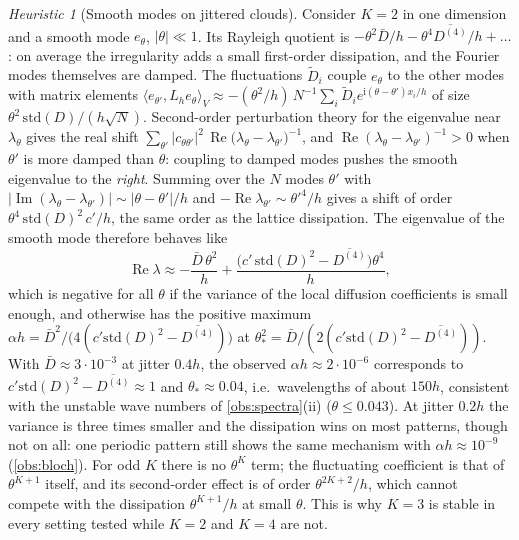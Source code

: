\documentclass[11pt,a4paper]{article}
\theoremstyle{plain}
\theoremstyle{definition}
\theoremstyle{remark}
\newtheorem{heuristic}[theorem]{Heuristic}
\numberwithin{equation}{section}
\renewcommand{\Re}{\operatorname{Re}}
\renewcommand{\Im}{\operatorname{Im}}
\newcommand{\ii}{\mathrm{i}}
\begin{document}
\begin{heuristic}[Smooth modes on jittered clouds]\label{heur:fluct}
Consider $K=2$ in one dimension and a smooth mode $e_\theta$, $|\theta|\ll1$. Its Rayleigh quotient is $-\theta^2\bar D/h-\theta^4\overline{D^{(4)}}/h+\dots$: on average the irregularity adds a small first-order dissipation, and the Fourier modes themselves are damped. The fluctuations $\tilde D_i$ couple $e_\theta$ to the other modes with matrix elements $\langle e_{\theta'},L_he_\theta\rangle_V\approx-(\theta^2/h)\,N^{-1}\sum_i\tilde D_ie^{\ii(\theta-\theta')x_i/h}$ of size $\theta^2\,\mathrm{std}(D)/(h\sqrt N)$. Second-order perturbation theory for the eigenvalue near $\lambda_\theta$ gives the real shift $\sum_{\theta'}|c_{\theta\theta'}|^2\,\Re\big(\lambda_\theta-\lambda_{\theta'}\big)^{-1}$, and $\Re(\lambda_\theta-\lambda_{\theta'})^{-1}>0$ when $\theta'$ is more damped than $\theta$: coupling to damped modes pushes the smooth eigenvalue to the \emph{right}. Summing over the $N$ modes $\theta'$ with $|\Im(\lambda_\theta-\lambda_{\theta'})|\sim|\theta-\theta'|/h$ and $-\Re\lambda_{\theta'}\sim\theta'^4/h$ gives a shift of order $\theta^4\,\mathrm{std}(D)^2\,c'/h$, the same order as the lattice dissipation. The eigenvalue of the smooth mode therefore behaves like
\begin{equation}\label{eq:heur}
\Re\lambda\approx-\frac{\bar D\,\theta^2}{h}+\frac{\big(c'\,\mathrm{std}(D)^2-\overline{D^{(4)}}\big)\theta^4}{h},
\end{equation}
which is negative for all $\theta$ if the variance of the local diffusion coefficients is small enough, and otherwise has the positive maximum $\alpha h=\bar D^2/\big(4(c'\mathrm{std}(D)^2-\overline{D^{(4)}})\big)$ at $\theta_*^2=\bar D/(2(c'\mathrm{std}(D)^2-\overline{D^{(4)}}))$. With $\bar D\approx3\cdot10^{-3}$ at jitter $0.4h$, the observed $\alpha h\approx2\cdot10^{-6}$ corresponds to $c'\mathrm{std}(D)^2-\overline{D^{(4)}}\approx1$ and $\theta_*\approx0.04$, i.e.\ wavelengths of about $150h$, consistent with the unstable wave numbers of \cref{obs:spectra}(ii) ($\theta\le0.043$). At jitter $0.2h$ the variance is three times smaller and the dissipation wins on most patterns, though not on all: one periodic pattern still shows the same mechanism with $\alpha h\approx10^{-9}$ (\cref{obs:bloch}). For odd $K$ there is no $\theta^K$ term; the fluctuating coefficient is that of $\theta^{K+1}$ itself, and its second-order effect is of order $\theta^{2K+2}/h$, which cannot compete with the dissipation $\theta^{K+1}/h$ at small $\theta$. This is why $K=3$ is stable in every setting tested while $K=2$ and $K=4$ are not.
\end{heuristic}
\end{document}
